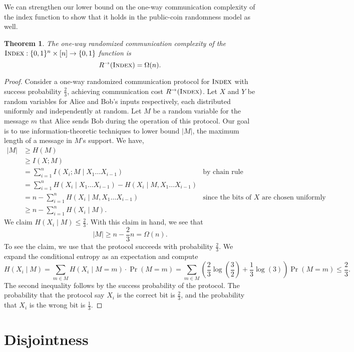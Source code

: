 \documentclass[11pt]{amsart}
\theoremstyle{plain}
\newtheorem{theorem}{Theorem}
\theoremstyle{definition}
\theoremstyle{plain}
\newcommand{\Index}{\textsc{Index}}
\begin{document}
We can strengthen our lower bound on the one-way communication complexity of the index function to show that it holds in the public-coin randomness model as well.

\begin{theorem}
The one-way randomized communication complexity of the $\Index : \{0,1\}^n \times [n] \to \{0,1\}$ function is
\[
R^\rightarrow(\Index) = \Omega(n).
\]
\end{theorem}

\begin{proof}
Consider a one-way randomized communication protocol for $\Index$ with success probability $\frac{2}{3}$, achieving communication cost $R^\rightarrow(\Index)$. Let $X$ and $Y$ be random variables for Alice and Bob's inputs respectively, each distributed uniformly and independently at random. Let $M$ be a random variable for the message $m$ that Alice sends Bob during the operation of this protocol. Our goal is to use information-theoretic techniques to lower bound $|M|$, the maximum length of a message in $M$'s support. We have,
\begin{align*}
|M| &\geq H(M)\\
&\geq I(X;M) \\
&=\sum_{i=1}^n I(X_i; M \mid X_1\dots X_{i-1}) &\text{by chain rule} \\
&=\sum_{i=1}^n H(X_i\mid X_1\dots X_{i-1}) - H(X_i\mid M, X_1\dots X_{i-1})\\
&= n - \sum_{i=1}^n H(X_i\mid M, X_1\dots X_{i-1}) &\text{since the bits of $X$ are chosen uniformly independently} \\
&\geq n-\sum_{i=1}^n H(X_i\mid M).
\end{align*} 
We claim $H(X_i\mid M)\leq \frac{2}{3}$. With this claim in hand, we see that
$$|M| \geq n-\frac{2}{3}n =\Omega(n).$$
To see the claim, we use that the protocol succeeds with probability $\frac{2}{3}$. We expand the conditional entropy as an expectation and compute
$$H(X_i\mid M) = \sum_{m\in M} H(X_i\mid M=m)\cdot \Pr(M=m) = \sum_{m\in M}(\frac{2}{3}\log(\frac{3}{2}) + \frac{1}{3}\log(3))\Pr(M=m) \leq \frac{2}{3}.$$
The second inequality follows by the success probability of the protocol. The probability that the protocol say $X_i$ is the correct bit is $\frac{2}{3}$, and the probability that $X_i$ is the wrong bit is $\frac{1}{3}$.
\end{proof}



\newpage 
\section{Disjointness}
\end{document}
